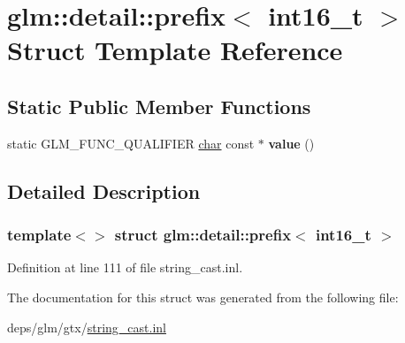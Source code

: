 \hypertarget{structglm_1_1detail_1_1prefix_3_01int16__t_01_4}{}\section{glm\+:\+:detail\+:\+:prefix$<$ int16\+\_\+t $>$ Struct Template Reference}
\label{structglm_1_1detail_1_1prefix_3_01int16__t_01_4}
\subsection*{Static Public Member Functions}
\begin{DoxyCompactItemize}
\item 
\mbox{\label{structglm_1_1detail_1_1prefix_3_01int16__t_01_4_a0ccbfcd8a1f5a2b777dbc43bad141bb6}} 
static G\+L\+M\+\_\+\+F\+U\+N\+C\+\_\+\+Q\+U\+A\+L\+I\+F\+I\+ER \hyperlink{classchar}{char} const  $\ast$ {\bfseries value} ()
\end{DoxyCompactItemize}


\subsection{Detailed Description}
\subsubsection*{template$<$$>$\newline
struct glm\+::detail\+::prefix$<$ int16\+\_\+t $>$}



Definition at line 111 of file string\+\_\+cast.\+inl.



The documentation for this struct was generated from the following file\+:\begin{DoxyCompactItemize}
\item 
deps/glm/gtx/\hyperlink{string__cast_8inl}{string\+\_\+cast.\+inl}\end{DoxyCompactItemize}
